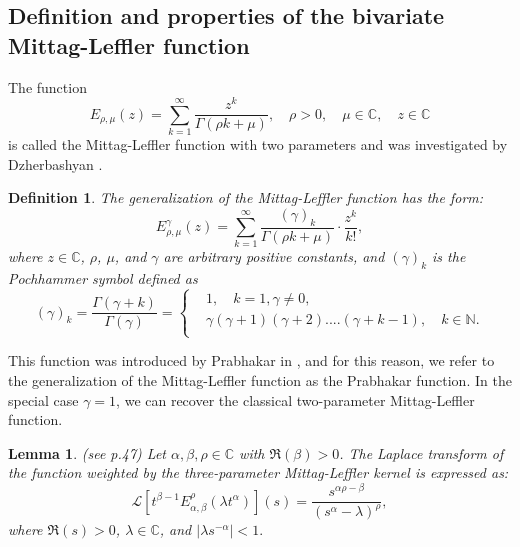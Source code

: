 \documentclass{amsart}
\numberwithin{equation}{section}
\newtheorem{lem}[thm]{Lemma}
\newtheorem{defin}[thm]{Definition}
\begin{document}
 \subsection{Definition and properties of the bivariate Mittag-Leffler function}
 The function
\begin{equation*}
E_{\rho, \mu}(z)= \sum\limits_{k=1}^\infty \frac{z^k}{\Gamma(\rho
k+\mu)}, \quad \rho>0,\quad  \mu \in \mathbb{C},\quad  z\in\mathbb{C}
\end{equation*}
is called the Mittag-Leffler function with two parameters and was investigated by Dzherbashyan  \cite{jumaeva:ref:23}.

\begin{defin}
The generalization of the Mittag-Leffler function  has the form:
\begin{equation*}
E^{\gamma}_{\rho, \mu}(z)= \sum\limits_{k=1}^\infty \frac{(\gamma)_{k}}{\Gamma(\rho k+\mu)}\cdot\frac{z^{k}}{k!},
\end{equation*}
where $z \in \mathbb{C}$, $\rho$, $\mu$, and $\gamma$ are arbitrary positive constants, and $(\gamma)_{k}$ is the Pochhammer symbol defined as
\begin{equation*}
(\gamma)_{k}=\frac{\Gamma(\gamma+k)}{\Gamma(\gamma)}=\begin{cases}
  & 1,\quad  k=1, \gamma\neq0 ,\\
 & \gamma(\gamma+1)(\gamma+2)....(\gamma+k-1), \quad k\in\mathbb{N} .\\
\end{cases}
\end{equation*} \label{jumaeva:def:2}
\end{defin} 
This function was introduced by Prabhakar in \cite{jumaeva:ref:24}, and for this reason, we refer to the generalization of the Mittag-Leffler function as the Prabhakar function. In the special case $\gamma=1$, we can recover the classical two-parameter Mittag-Leffler function.
\begin{lem}(see \cite{jumaeva:ref:25} p.47)
Let $\alpha, \beta, \rho \in \mathbb{C}$ with $\Re(\beta) > 0$. The Laplace transform of the function weighted by the three-parameter Mittag-Leffler kernel is expressed as:
\begin{equation}\label{jumaeva:eq:5}
    \mathcal{L} \left[ t^{\beta-1} E_{\alpha, \beta}^{\rho} (\lambda t^{\alpha}) \right] (s) = \frac{s^{\alpha\rho-\beta}}{(s^{\alpha} - \lambda)^{\rho}},
\end{equation}
where $\Re(s) > 0$, $\lambda \in \mathbb{C}$, and $| \lambda s^{-\alpha} | < 1.$ \label{jumaeva:lem:2}
\end{lem}
\end{document}
